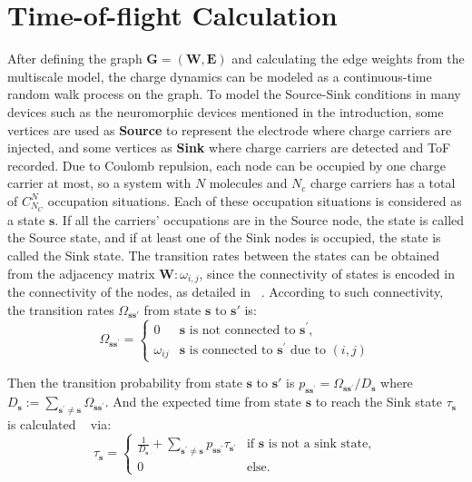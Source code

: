\documentclass[letterpaper,12pt]{article}
\begin{document}
\section{Time-of-flight Calculation}
After defining the graph $\mathbf{G}=(\mathbf{W},\mathbf{E})$ and calculating the edge weights from the multiscale model, the charge dynamics can be modeled as a continuous-time random walk process on the graph. 
To model the Source-Sink conditions in many devices such as the neuromorphic devices mentioned in the introduction, some vertices are used as \textbf{Source} to represent the electrode where charge carriers are injected, and some vertices as \textbf{Sink} where charge carriers are detected and ToF recorded.
Due to Coulomb repulsion, each node can be occupied by one charge carrier at most, so a system with $N$ molecules and $N_c$ charge carriers has a total of $C^N_{N_C}$ occupation situations. Each of these occupation situations is considered as a state $\mathbf{s}$. 
If all the carriers' occupations are in the Source node, the state is called the Source state, and if at least one of the Sink nodes is occupied, the state is called the Sink state. 
The transition rates between the states can be obtained from the adjacency matrix $\mathbf{W}:\omega_{i,j}$, since the connectivity of states is encoded in the connectivity of the nodes, as detailed in ~\cite{chen_graph_2024}. 
According to such connectivity, 
the transition rates $\Omega_{\mathbf{s} \mathbf{s}' }$ from state $\mathbf{s}$ to $\mathbf{s}'$ is:
\begin{equation}\label{eq:transition_rates}
	\Omega_{\mathbf{s} \mathbf{s}^\prime} =
	\begin{cases}
	     0			&  \mathbf{s} \text{ is not connected to } \mathbf{s}^\prime,\\
	    \omega_{ij}	&  \mathbf{s} \text{ is connected to } \mathbf{s}^\prime \text{ due to } (i,j)
	\end{cases}
\end{equation}

Then the transition probability from state $\mathbf{s}$ to $\mathbf{s}'$ is $p_{\mathbf{s} \mathbf{s}^\prime} = \Omega_{\mathbf{s} \mathbf{s}^\prime}/D_\mathbf{s}$ where $D_\mathbf{s} := \sum_{\mathbf{s}^\prime \ne \mathbf{s}} \Omega_{\mathbf{s} \mathbf{s}^\prime}$.
And the expected time from state $\mathbf{s}$ to reach the Sink state $\tau_\mathbf{s}$ is calculated 
~\cite{chen_graph_2024} via: 
\begin{equation}\label{eq:hitting_time}
	\tau_\mathbf{s} = \begin{cases}
		\frac{1}{D_\mathbf{s}} + \sum_{\mathbf{s}^\prime \ne \mathbf{s}} p_{\mathbf{s} \mathbf{s}^\prime} \tau_{\mathbf{s}^\prime} &\text{if $\mathbf{s}$ is not a sink state},\\
		0 &\text{else.} 
	\end{cases}
\end{equation} 
\end{document}
